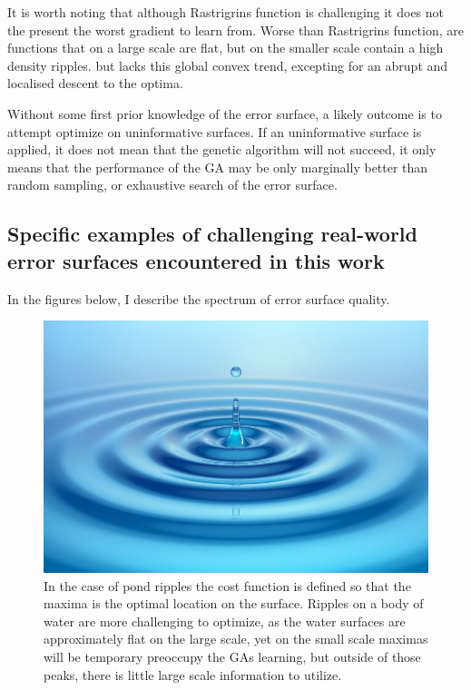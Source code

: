    It is worth noting that although Rastrigrins function is challenging it does not the present the worst gradient to learn from. Worse than Rastrigrins function, are functions that on a large scale are flat, but on the smaller scale contain a high density ripples.
   but lacks this global convex trend, excepting for an abrupt and localised descent to the optima.
   
   Without some first prior knowledge of the error surface, a likely outcome is to attempt optimize on uninformative surfaces. If an uninformative surface is applied, it does not mean that the genetic algorithm will not succeed, it only means that the performance of the GA may be only marginally better than random sampling, or exhaustive search of the error surface.

\subsection{Specific examples of challenging real-world error surfaces encountered in this work}
In the figures below, I describe the spectrum of error surface quality.
\begin{center}
\begin{figure}
     \includegraphics[scale=0.65]{figures/pond_ripple_surface.png}
     \caption[Conceptualizing moderate to worst case error surfaces]{In the case of pond ripples the cost function is defined so that the maxima is the optimal location on the surface. Ripples on a body of water are more challenging to optimize, as the water surfaces are approximately flat on the large scale, yet on the small scale maximas will be temporary preoccupy the GAs learning, but outside of those peaks, there is little large scale information to utilize. }
      
      \label{fig:test1}
\end{figure}
\end{center}


